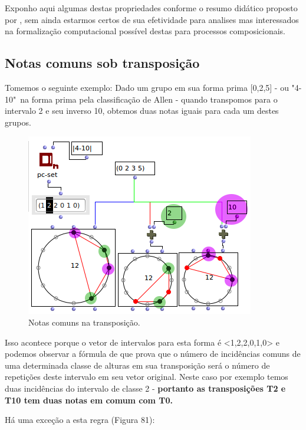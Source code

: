 \documentclass[
	12pt,				%
	openright,			%
	twoside,			%
	a4paper,			%
	english,			%
	french,				%
	spanish,			%
	brazil				%
	]{abntex2}
\begin{document}
\begin{apendicesenv}
Exponho aqui algumas destas propriedades conforme o resumo didático proposto por , sem ainda estarmos certos de sua efetividade para analises mas interessados na formalização computacional possível destas para processos composicionais.


\subsection{Notas comuns sob transposição}

Tomemos o seguinte exemplo: Dado um grupo em sua forma prima [0,2,5] - ou "4-10"\ na forma prima pela classificação de Allen  - quando transpomos para o intervalo 2 e seu inverso 10, obtemos duas notas iguais para cada um destes grupos.

\begin{figure}[!h]
	\caption{\label{fig_grafico}Notas comuns na transposição. }
	\begin{center}
	    \includegraphics[scale=0.7]{OM_settheory/notas_comuns_2e10.png}
	\end{center}
\end{figure}


Isso acontece porque o vetor de intervalos para esta forma é <1,2,2,0,1,0> e podemos observar a fórmula de  que prova que o número de incidências comuns de uma determinada classe de alturas em sua transposição será o número de repetições deste intervalo em seu vetor original. Neste caso por exemplo temos duas incidências do intervalo de classe 2 - \textbf{portanto as transposições T2 e T10 tem duas notas em comum com T0.}

Há uma exceção a esta regra (Figura 81):
 

\end{apendicesenv}
\end{document}
